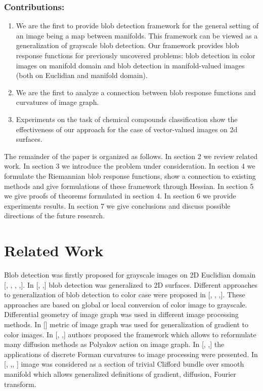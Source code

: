 \documentclass{llncs}
\begin{document}
\subsubsection{Contributions:}
\begin{enumerate}
\item We are the first to provide blob detection framework for the general setting of an image being a map between manifolds. This framework can be viewed as a generalization of grayscale blob detection. Our framework provides blob response functions for previously uncovered problems: blob detection in color images on manifold domain and blob detection in manifold-valued images (both on Euclidian and manifold domain). 
\item We are the first to analyze a connection between blob response functions and curvatures of image graph.
\item Experiments on the task of chemical compounds classification show the effectiveness of our approach for the case of vector-valued images on 2d surfaces.  
\end{enumerate}

The remainder of the paper is organized as follows. In section 2 we review related work. In section 3 we introduce the problem under consideration. In section 4 we formulate the Riemannian blob response functions, show a connection to existing methods and give formulations of these framework through Hessian. In section 5 we give proofs of theorems formulated in section 4. In section 6 we provide experiments results. In section 7 we give conclusions and discuss possible directions of the future research.

\section{Related Work}
Blob detection was firstly proposed for grayscale images on 2D Euclidian domain [, , , ,]. In [, ,] blob detection was generalized to 2D surfaces. Different approaches to generalization of blob detection to color case were proposed in [, , ,]. These approaches are based on global or local conversion of color image to grayscale.
\\
Differential geometry of image graph was used in different image processing methods. In [] metric of image graph was used for generalization of gradient to color images. In [, ,] authors proposed the framework which allows to reformulate many diffusion methods as Polyakov action on image graph. In [, ,] the applications of discrete Forman curvatures to image processing were presented. In [, ,, ] image was considered as a section of trivial Clifford bundle over smooth manifold which allows generalized definitions of gradient, diffusion, Fourier transform.
\end{document}
